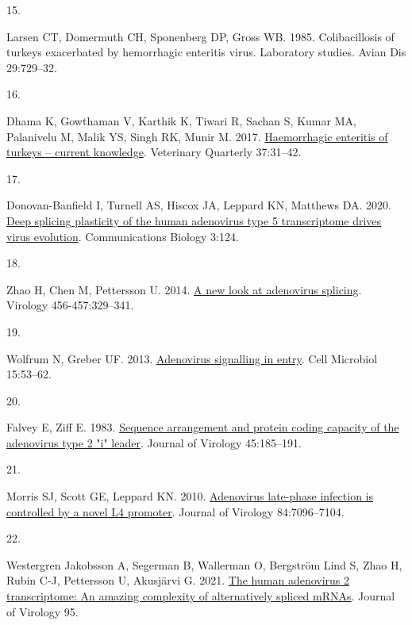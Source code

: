 \documentclass[
]{article}
\newlength{\cslhangindent}
\newlength{\csllabelwidth}
\newenvironment{CSLReferences}[2] %
 {\begin{list}{}{%
  \setlength{\itemindent}{0pt}
  \setlength{\leftmargin}{0pt}
  \setlength{\parsep}{0pt}
  \ifodd #1
   \setlength{\leftmargin}{\cslhangindent}
   \setlength{\itemindent}{-1\cslhangindent}
  \fi
  \setlength{\itemsep}{#2\baselineskip}}}
 {\end{list}}
\newcommand{\CSLLeftMargin}[1]{\parbox[t]{\csllabelwidth}{\strut#1\strut}}
\newcommand{\CSLRightInline}[1]{\parbox[t]{\linewidth - \csllabelwidth}{\strut#1\strut}}
\begin{document}
\begin{CSLReferences}{0}{1}
\CSLLeftMargin{15. }%
\CSLRightInline{Larsen CT, Domermuth CH, Sponenberg DP, Gross WB. 1985.
Colibacillosis of turkeys exacerbated by hemorrhagic enteritis virus.
Laboratory studies. Avian Dis 29:729--32.}

\CSLLeftMargin{16. }%
\CSLRightInline{Dhama K, Gowthaman V, Karthik K, Tiwari R, Sachan S,
Kumar MA, Palanivelu M, Malik YS, Singh RK, Munir M. 2017.
\href{https://doi.org/10.1080/01652176.2016.1277281}{Haemorrhagic
enteritis of turkeys -- current knowledge}. Veterinary Quarterly
37:31--42.}

\CSLLeftMargin{17. }%
\CSLRightInline{Donovan-Banfield I, Turnell AS, Hiscox JA, Leppard KN,
Matthews DA. 2020. \href{https://doi.org/10.1038/s42003-020-0849-9}{Deep
splicing plasticity of the human adenovirus type 5 transcriptome drives
virus evolution}. Communications Biology 3:124.}

\CSLLeftMargin{18. }%
\CSLRightInline{Zhao H, Chen M, Pettersson U. 2014.
\href{https://doi.org/10.1016/j.virol.2014.04.006}{A new look at
adenovirus splicing}. Virology 456-457:329--341.}

\CSLLeftMargin{19. }%
\CSLRightInline{Wolfrum N, Greber UF. 2013.
\href{https://doi.org/10.1111/cmi.12053}{Adenovirus signalling in
entry}. Cell Microbiol 15:53--62.}

\CSLLeftMargin{20. }%
\CSLRightInline{Falvey E, Ziff E. 1983.
\href{https://doi.org/10.1128/jvi.45.1.185-191.1983}{Sequence
arrangement and protein coding capacity of the adenovirus type 2 "i"
leader}. Journal of Virology 45:185--191.}

\CSLLeftMargin{21. }%
\CSLRightInline{Morris SJ, Scott GE, Leppard KN. 2010.
\href{https://doi.org/10.1128/jvi.00107-10}{Adenovirus late-phase
infection is controlled by a novel L4 promoter}. Journal of Virology
84:7096--7104.}

\CSLLeftMargin{22. }%
\CSLRightInline{Westergren Jakobsson A, Segerman B, Wallerman O,
Bergström Lind S, Zhao H, Rubin C-J, Pettersson U, Akusjärvi G. 2021.
\href{https://doi.org/10.1128/jvi.01869-20}{The human adenovirus 2
transcriptome: An amazing complexity of alternatively spliced mRNAs}.
Journal of Virology 95.}


\end{CSLReferences}
\end{document}
